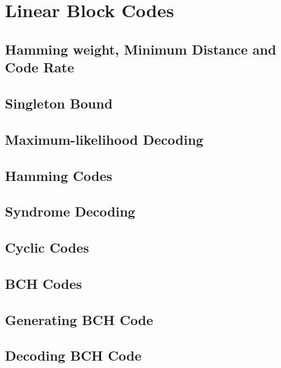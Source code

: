 \chapter{Linear Block Codes}
\section{Hamming weight, Minimum Distance and Code Rate}
\section{Singleton Bound}
\section{Maximum-likelihood Decoding}
\section{Hamming Codes}
\section{Syndrome Decoding}
\section{Cyclic Codes}
\section{BCH Codes}
\section{Generating BCH Code}
\section{Decoding BCH Code}
